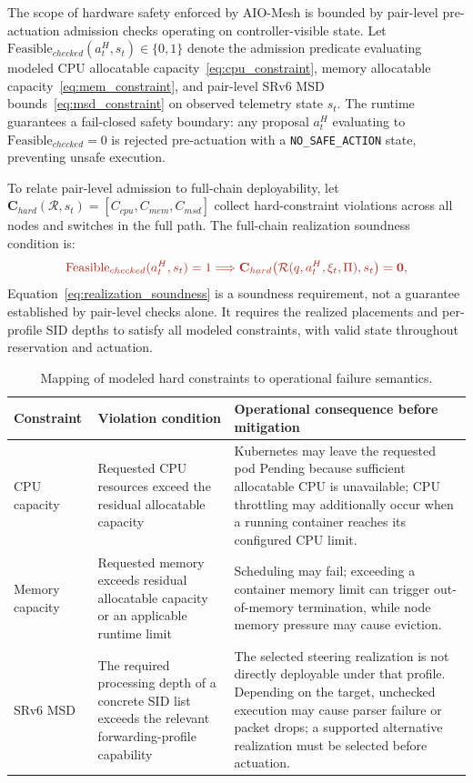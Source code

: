 \documentclass[final,5p]{elsarticle}
\newcommand{\rev}[1]{\textcolor{BrickRed}{#1}}
\begin{document}
\rev{The scope of hardware safety enforced by AIO-Mesh is bounded by pair-level pre-actuation admission checks operating on controller-visible state. Let $\mathrm{Feasible}_{checked}(a_t^H,s_t)\in\{0,1\}$ denote the admission predicate evaluating modeled CPU allocatable capacity~\eqref{eq:cpu_constraint}, memory allocatable capacity~\eqref{eq:mem_constraint}, and pair-level SRv6 MSD bounds~\eqref{eq:msd_constraint} on observed telemetry state $s_t$. The runtime guarantees a fail-closed safety boundary: any proposal $a_t^H$ evaluating to $\mathrm{Feasible}_{checked}=0$ is rejected pre-actuation with a \texttt{NO\_SAFE\_ACTION} state, preventing unsafe execution.}

\rev{To relate pair-level admission to full-chain deployability, let $\mathbf{C}_{hard}(\mathcal{R},s_t)=[C_{cpu},C_{mem},C_{msd}]$ collect hard-constraint violations across all nodes and switches in the full path. The full-chain realization soundness condition is:}
\begin{equation}
    \rev{\mathrm{Feasible}_{checked}(a_t^H,s_t)=1\Longrightarrow\mathbf{C}_{hard}\!\left(\mathcal{R}(q,a_t^H,\xi_t,\Pi),s_t\right)=\mathbf{0},}
\label{eq:realization_soundness}
\end{equation}
\rev{Equation~\eqref{eq:realization_soundness} is a soundness requirement, not a guarantee established by pair-level checks alone. It requires the realized placements and per-profile SID depths to satisfy all modeled constraints, with valid state throughout reservation and actuation.}

\begin{table}[!tb]
\centering
\caption{\rev{Mapping of modeled hard constraints to operational failure semantics.}}
\label{tab:hard_constraint_failure_mapping}
\renewcommand{\arraystretch}{1.15}
\small
\begin{tabularx}{\textwidth}{p{2.6cm}p{4.0cm}X}
\toprule
\rev{\textbf{Constraint}} & \rev{\textbf{Violation condition}} & \rev{\textbf{Operational consequence before mitigation}} \\
\midrule
\rev{CPU capacity} & \rev{Requested CPU resources exceed the residual allocatable capacity} & \rev{Kubernetes may leave the requested pod Pending because sufficient allocatable CPU is unavailable; CPU throttling may additionally occur when a running container reaches its configured CPU limit.} \\
\rev{Memory capacity} & \rev{Requested memory exceeds residual allocatable capacity or an applicable runtime limit} & \rev{Scheduling may fail; exceeding a container memory limit can trigger out-of-memory termination, while node memory pressure may cause eviction.} \\
\rev{SRv6 MSD} & \rev{The required processing depth of a concrete SID list exceeds the relevant forwarding-profile capability} & \rev{The selected steering realization is not directly deployable under that profile. Depending on the target, unchecked execution may cause parser failure or packet drops; a supported alternative realization must be selected before actuation.} \\
\bottomrule
\end{tabularx}
\end{table}
\end{document}

